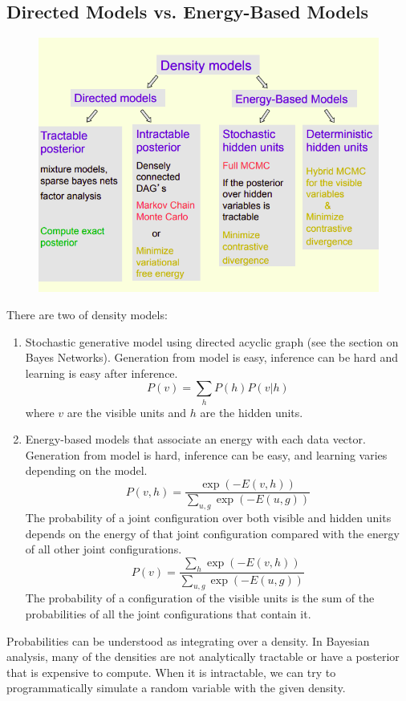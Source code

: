 \documentclass{article}
\begin{document}
\subsection{Directed Models vs. Energy-Based Models}
\begin{figure}[H]
    \centering
    \includegraphics[width=12cm]{dag-ebm.png}
\end{figure}

There are two of density models:
\begin{enumerate}
    \item Stochastic generative model using directed acyclic graph (see the section on Bayes Networks). Generation from model is easy, inference can be hard and learning is easy after inference.
    \[
        P(v) = \sum_h P(h)P(v | h)
    \]
    where $v$ are the visible units and $h$ are the hidden units.
    
    \item Energy-based models that associate an energy with each data vector. Generation from model is hard, inference can be easy, and learning varies depending on the model.
    \[
        P(v, h) = \frac{\exp(-E(v, h))}{\sum_{u, g} \exp(-E(u, g))}
    \]
    The probability of a joint configuration over both visible and hidden units depends on the energy of that joint configuration compared with the energy of all other joint configurations.
    \[
         P(v) = \frac{\sum_{h} \exp(-E(v, h))}{\sum_{u, g} \exp(-E(u, g))}
    \]
    The probability of a configuration of the visible units is the sum of the probabilities of all the joint configurations that contain it. 
\end{enumerate}


Probabilities can be understood as integrating over a density. In Bayesian analysis, many of the densities are not analytically tractable or have a posterior that is expensive to compute. When it is intractable, we can try to programmatically simulate a random variable with the given density. 
\end{document}
